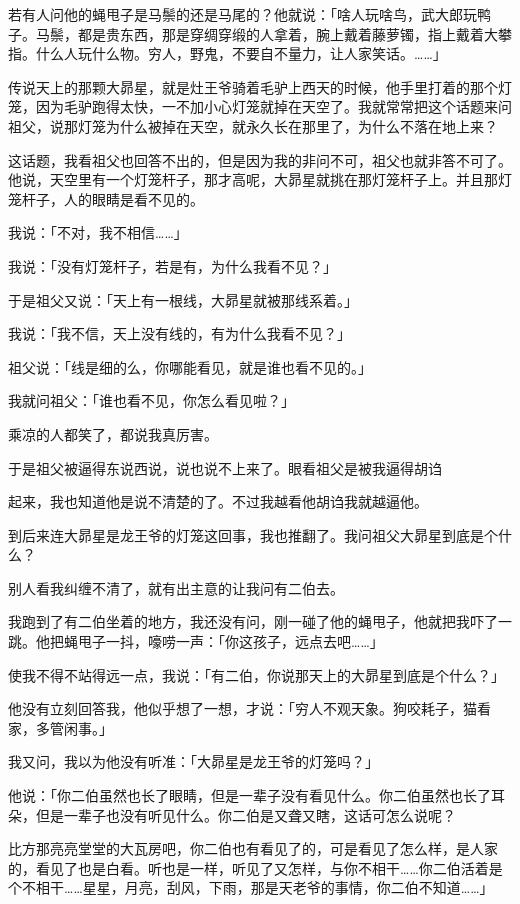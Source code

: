 \documentclass[UTF8]{ctexart}
\begin{document}
若有人问他的蝇甩子是马鬃的还是马尾的？他就说：「啥人玩啥鸟，武大郎玩鸭子。马鬃，都是贵东西，那是穿绸穿缎的人拿着，腕上戴着藤萝镯，指上戴着大攀指。什么人玩什么物。穷人，野鬼，不要自不量力，让人家笑话。……」

传说天上的那颗大昴星，就是灶王爷骑着毛驴上西天的时候，他手里打着的那个灯笼，因为毛驴跑得太快，一不加小心灯笼就掉在天空了。我就常常把这个话题来问祖父，说那灯笼为什么被掉在天空，就永久长在那里了，为什么不落在地上来？

这话题，我看祖父也回答不出的，但是因为我的非问不可，祖父也就非答不可了。他说，天空里有一个灯笼杆子，那才高呢，大昴星就挑在那灯笼杆子上。并且那灯笼杆子，人的眼睛是看不见的。

我说：「不对，我不相信……」

我说：「没有灯笼杆子，若是有，为什么我看不见？」

于是祖父又说：「天上有一根线，大昴星就被那线系着。」

我说：「我不信，天上没有线的，有为什么我看不见？」

祖父说：「线是细的么，你哪能看见，就是谁也看不见的。」

我就问祖父：「谁也看不见，你怎么看见啦？」

乘凉的人都笑了，都说我真厉害。

于是祖父被逼得东说西说，说也说不上来了。眼看祖父是被我逼得胡诌

起来，我也知道他是说不清楚的了。不过我越看他胡诌我就越逼他。

到后来连大昴星是龙王爷的灯笼这回事，我也推翻了。我问祖父大昴星到底是个什么？

别人看我纠缠不清了，就有出主意的让我问有二伯去。

我跑到了有二伯坐着的地方，我还没有问，刚一碰了他的蝇甩子，他就把我吓了一跳。他把蝇甩子一抖，嚎唠一声：「你这孩子，远点去吧……」

使我不得不站得远一点，我说：「有二伯，你说那天上的大昴星到底是个什么？」

他没有立刻回答我，他似乎想了一想，才说：「穷人不观天象。狗咬耗子，猫看家，多管闲事。」

我又问，我以为他没有听准：「大昴星是龙王爷的灯笼吗？」

他说：「你二伯虽然也长了眼睛，但是一辈子没有看见什么。你二伯虽然也长了耳朵，但是一辈子也没有听见什么。你二伯是又聋又瞎，这话可怎么说呢？

比方那亮亮堂堂的大瓦房吧，你二伯也有看见了的，可是看见了怎么样，是人家的，看见了也是白看。听也是一样，听见了又怎样，与你不相干……你二伯活着是个不相干……星星，月亮，刮风，下雨，那是天老爷的事情，你二伯不知道……」
\end{document}
